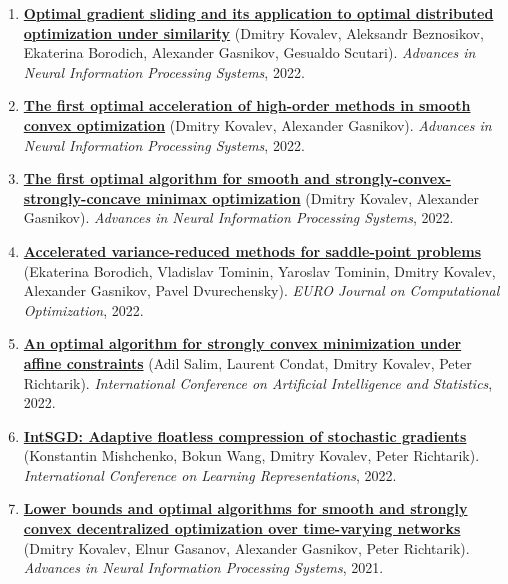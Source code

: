 \begin{enumerate}
\item
\textbf{\href{https://proceedings.neurips.cc/paper_files/paper/2022/hash/d88f6f81e1aaf606776ffdd06fdf24ef-Abstract-Conference.html}{Optimal gradient sliding and its application to optimal distributed optimization under similarity}} (Dmitry Kovalev, Aleksandr Beznosikov, Ekaterina Borodich, Alexander Gasnikov, Gesualdo Scutari). \textit{Advances in Neural Information Processing Systems}, 2022.
\item
\textbf{\href{https://proceedings.neurips.cc/paper_files/paper/2022/hash/e56f394bbd4f0ec81393d767caa5a31b-Abstract-Conference.html}{The first optimal acceleration of high-order methods in smooth convex optimization}} (Dmitry Kovalev, Alexander Gasnikov). \textit{Advances in Neural Information Processing Systems}, 2022.
\item
\textbf{\href{https://proceedings.neurips.cc/paper_files/paper/2022/hash/5e2ed801f62102f531d109d7c6e1b62f-Abstract-Conference.html}{The first optimal algorithm for smooth and strongly-convex-strongly-concave minimax optimization}} (Dmitry Kovalev, Alexander Gasnikov). \textit{Advances in Neural Information Processing Systems}, 2022.
\item
\textbf{\href{http://crm-en.ics.org.ru/uploads/crmissues/crm_2023_02/22_tominin.pdf}{Accelerated variance-reduced methods for saddle-point problems}} (Ekaterina Borodich, Vladislav Tominin, Yaroslav Tominin, Dmitry Kovalev, Alexander Gasnikov, Pavel Dvurechensky). \textit{EURO Journal on Computational Optimization}, 2022.
\item
\textbf{\href{https://proceedings.mlr.press/v151/salim22a.html}{An optimal algorithm for strongly convex minimization under affine constraints}} (Adil Salim, Laurent Condat, Dmitry Kovalev, Peter Richtarik). \textit{International Conference on Artificial Intelligence and Statistics}, 2022.
\item
\textbf{\href{https://arxiv.org/abs/2102.08374}{IntSGD: Adaptive floatless compression of stochastic gradients}} (Konstantin Mishchenko, Bokun Wang, Dmitry Kovalev, Peter Richtarik). \textit{International Conference on Learning Representations}, 2022.
\item
\textbf{\href{https://proceedings.neurips.cc/paper/2021/hash/bc37e109d92bdc1ea71da6c919d54907-Abstract.html}{Lower bounds and optimal algorithms for smooth and strongly convex decentralized optimization over time-varying networks}} (Dmitry Kovalev, Elnur Gasanov, Alexander Gasnikov, Peter Richtarik). \textit{Advances in Neural Information Processing Systems}, 2021.

\end{enumerate}
